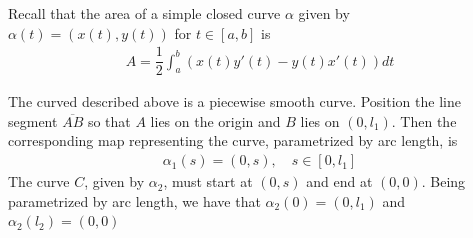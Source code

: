 \documentclass{article}
\begin{document}
	Recall that the area of a simple closed curve $\alpha$ given by $\alpha(t) = \left( x(t), y(t) \right)$ for $t \in [a, b]$ is
	\begin{gather*}
		A = \dfrac{1}{2} \int_a^b \left( x(t) y'(t) - y(t) x'(t) \right) dt
	\end{gather*}
	
	The curved described above is a piecewise smooth curve. Position the line segment $\overline{AB}$ so that $A$ lies on the origin and $B$ lies on $(0, l_1)$. Then the corresponding map representing the curve, parametrized by arc length, is
	\begin{gather*}
		\alpha_1(s) = (0, s), \quad s \in [0, l_1]
	\end{gather*}
	The curve $C$, given by $\alpha_2$, must start at $(0, s)$ and end at $(0, 0)$. Being parametrized by arc length, we have that $\alpha_2(0) = (0, l_1)$ and $\alpha_2(l_2) = (0, 0)$ 
\end{document}

